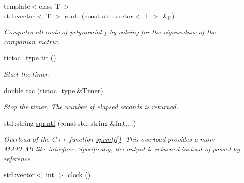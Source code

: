 \begin{DoxyCompactItemize}
\item 
\hypertarget{namespacekeycpp_a7752b443d306871030c8867467fe6cc9}{{\footnotesize template$<$class T $>$ }\\std\-::vector$<$ T $>$ \hyperlink{namespacekeycpp_a7752b443d306871030c8867467fe6cc9}{roots} (const std\-::vector$<$ T $>$ \&p)}\label{namespacekeycpp_a7752b443d306871030c8867467fe6cc9}

\begin{DoxyCompactList}\small\item\em Computes all roots of polynomial p by solving for the eigenvalues of the companion matrix. \end{DoxyCompactList}\item 
\hypertarget{namespacekeycpp_a6069a9eec0edfa1d401230013d98765e}{\hyperlink{structkeycpp_1_1tictoc__type}{tictoc\-\_\-type} \hyperlink{namespacekeycpp_a6069a9eec0edfa1d401230013d98765e}{tic} ()}\label{namespacekeycpp_a6069a9eec0edfa1d401230013d98765e}

\begin{DoxyCompactList}\small\item\em Start the timer. \end{DoxyCompactList}\item 
\hypertarget{namespacekeycpp_afe03fbbb5126729fb4b9367097acb1d1}{double \hyperlink{namespacekeycpp_afe03fbbb5126729fb4b9367097acb1d1}{toc} (\hyperlink{structkeycpp_1_1tictoc__type}{tictoc\-\_\-type} \&Timer)}\label{namespacekeycpp_afe03fbbb5126729fb4b9367097acb1d1}

\begin{DoxyCompactList}\small\item\em Stop the timer. The number of elapsed seconds is returned. \end{DoxyCompactList}\item 
\hypertarget{namespacekeycpp_a9d70a761d33bbc2bdec6b4e0eb43d517}{std\-::string \hyperlink{namespacekeycpp_a9d70a761d33bbc2bdec6b4e0eb43d517}{sprintf} (const std\-::string \&fmt,...)}\label{namespacekeycpp_a9d70a761d33bbc2bdec6b4e0eb43d517}

\begin{DoxyCompactList}\small\item\em Overload of the C++ function \hyperlink{namespacekeycpp_a9d70a761d33bbc2bdec6b4e0eb43d517}{sprintf()}. This overload provides a more M\-A\-T\-L\-A\-B-\/like interface. Specifically, the output is returned instead of passed by reference. \end{DoxyCompactList}\item 
\hypertarget{namespacekeycpp_aff2feefaeb946dd453d74ff51c66fe67}{std\-::vector$<$ int $>$ \hyperlink{namespacekeycpp_aff2feefaeb946dd453d74ff51c66fe67}{clock} ()}\label{namespacekeycpp_aff2feefaeb946dd453d74ff51c66fe67}


\end{DoxyCompactItemize}
